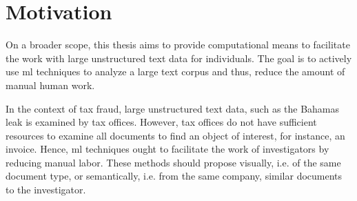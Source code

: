 \section{Motivation}\label{sec:motivation}

On a broader scope, this thesis aims to provide computational means to facilitate the work with large unstructured text data for individuals.
The goal is to actively use \ac{ml} techniques to analyze a large text corpus and thus, reduce the amount of manual human work.

In the context of tax fraud, large unstructured text data, such as the Bahamas leak is examined by tax offices.
However, tax offices do not have sufficient resources to examine all documents to find an object of interest, for instance, an invoice.
Hence, \ac{ml} techniques ought to facilitate the work of investigators by reducing manual labor.
These methods should propose visually, i.e. of the same document type, or semantically, i.e. from the same company, similar documents to the investigator.